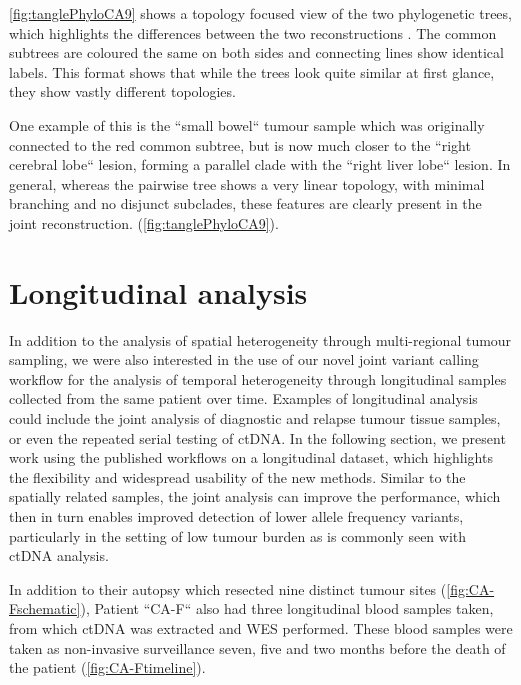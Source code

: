\autoref{fig:tanglePhyloCA9} shows a topology focused view of the two phylogenetic trees, which highlights the differences between the two reconstructions \cite{Vienne2018}. The common subtrees are coloured the same on both sides and connecting lines show identical labels. This format shows that while the trees look quite similar at first glance, they show vastly different topologies.


One example of this is the ``small bowel`` tumour sample which was originally connected to the red common subtree, but is now much closer to the ``right cerebral lobe`` lesion, forming a parallel clade with the ``right liver lobe`` lesion. In general, whereas the pairwise tree shows a very linear topology, with minimal branching and no disjunct subclades, these features are clearly present in the joint reconstruction.  (\autoref{fig:tanglePhyloCA9}).


\section[Longitudinal analysis]{Longitudinal analysis}
\label{variantcalling-sec:longitudinal}

In addition to the analysis of spatial heterogeneity through multi-regional tu\-mour sam\-pling, we were also interested in the use of our novel joint variant calling workflow for the analysis of temporal heterogeneity through longitudinal samples collected from the same patient over time. Examples of longitudinal analysis could include the joint analysis of diagnostic and relapse tumour tissue samples, or even the repeated serial testing of ctDNA. In the following section, we present work using the published workflows on a longitudinal dataset, which highlights the flexibility and widespread usability of the new methods. Similar to the spatially related samples, the joint analysis can improve the performance, which then in turn enables improved detection of lower allele frequency variants, particularly in the setting of low tumour burden as is commonly seen with ctDNA analysis.

In addition to their autopsy which resected nine distinct tumour sites (\autoref{fig:CA-Fschematic}), Patient ``CA-F`` also had three longitudinal blood samples taken, from which ctDNA was extracted and WES performed. These blood samples were taken as non-invasive surveillance seven, five and two months before the death of the patient (\autoref{fig:CA-Ftimeline}).

